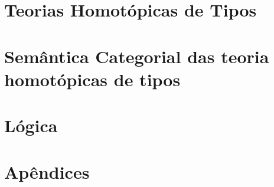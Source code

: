 \documentclass[a4paper]{article}
\theoremstyle{definition}
\begin{document}
            
    \newpage

        \part{Teorias Homotópicas de Tipos}


    \newpage
        \part{Semântica Categorial das teoria homotópicas de tipos}

    \newpage   
        \part{Lógica}
    \newpage

    \newpage
        \part{Apêndices}
        \setcounter{section}{0}

            

    \newpage
        

    \newpage
\end{document}
